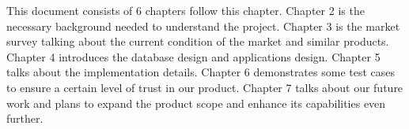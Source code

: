 This document consists of 6 chapters follow this chapter. Chapter 2 is the necessary background needed to understand the project. Chapter 3 is the market survey talking about the current condition of the market and similar products. Chapter 4 introduces the database design and applications design. Chapter 5 talks about the implementation details. Chapter 6 demonstrates some test cases to ensure a certain level of trust in our product. Chapter 7 talks about our future work and plans to expand the product scope and enhance its capabilities even further.